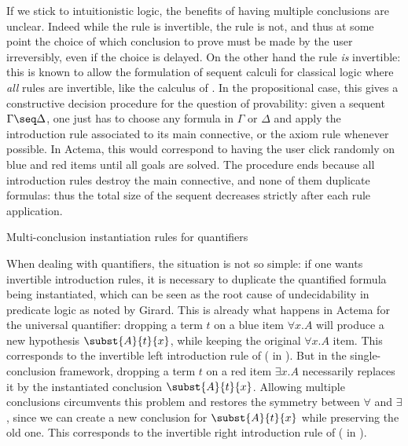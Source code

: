 If we stick to intuitionistic logic, the benefits of having multiple conclusions
are unclear. Indeed while the {} rule is invertible, the
{} rule is not, and thus at some point the choice of which
conclusion to prove must be made by the user irreversibly, even if the choice is
delayed. On the other hand the
{} rule \emph{is} invertible: this is known to allow the
formulation of sequent calculi for classical logic where \emph{all} rules are
invertible, like the  calculus of . In
the propositional case, this gives a constructive decision procedure for the
question of provability: given a sequent $\Gamma \seq \Delta$, one just has to
choose any formula in $\Gamma$ or $\Delta$ and apply the introduction rule
associated to its main connective, or the axiom rule whenever possible. In
Actema, this would correspond to having the user click randomly on blue and red
items until all goals are solved. The procedure ends because all introduction
rules destroy the main connective, and none of them duplicate formulas: thus the
total size of the sequent decreases strictly after each rule application.

\begin{marginfigure}
  \caption{Multi-conclusion instantiation rules for quantifiers}
\end{marginfigure}

When dealing with quantifiers, the situation is not so simple: if one wants
invertible introduction rules, it is necessary to duplicate the quantified
formula being instantiated, which can be seen as the root cause of
undecidability in predicate logic as noted by Girard. This is already what happens in
Actema for the universal quantifier: dropping a term $t$ on a blue item $\forall
x. A$ will produce a new hypothesis $\subst{A}{t}{x}$, while keeping the
original $\forall x. A$ item. This corresponds to the invertible left
introduction rule of  ({} in ).
But in the single-conclusion framework, dropping a term $t$ on a red item
$\exists x. A$ necessarily replaces it by the instantiated conclusion
$\subst{A}{t}{x}$. Allowing multiple conclusions circumvents this problem and
restores the symmetry between $\forall$ and $\exists$, since we can create a new
conclusion for $\subst{A}{t}{x}$ while preserving the old one. This corresponds
to the invertible right introduction rule of  ({} in
).

